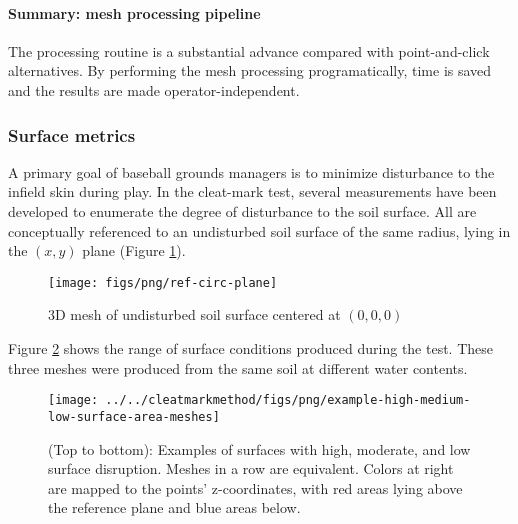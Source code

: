 \documentclass[
  letterpaper,
  openany]{book}
\begin{document}
\hypertarget{summary-mesh-processing-pipeline}{%
\paragraph{Summary: mesh processing pipeline}\label{summary-mesh-processing-pipeline}}

The processing routine is a substantial advance compared with point-and-click alternatives.
By performing the mesh processing programatically, time is saved and the results are made operator-independent.

\hypertarget{surface-metrics}{%
\subsubsection{Surface metrics}\label{surface-metrics}}

A primary goal of baseball grounds managers is to minimize disturbance to the infield skin during play.
In the cleat-mark test, several measurements have been developed to enumerate the degree of disturbance to the soil surface.
All are conceptually referenced to an undisturbed soil surface of the same radius, lying in the \((x, y)\) plane (Figure \ref{fig:ref-circ-plane-fig}).

\begin{figure}

{\centering \texttt{[image: figs/png/ref-circ-plane]} 

}

\caption[3D mesh of undisturbed soil surface]{3D mesh of undisturbed soil surface centered at $(0,0,0)$}\label{fig:ref-circ-plane-fig}
\end{figure}

Figure \ref{fig:example-meshes-panels} shows the range of surface conditions produced during the test.
These three meshes were produced from the same soil at different water contents.

\begin{figure}

{\centering \texttt{[image: ../../cleatmarkmethod/figs/png/example-high-medium-low-surface-area-meshes]} 

}

\caption[Example 3D meshes after testing.]{(Top to bottom): Examples of surfaces with high, moderate, and low surface disruption. Meshes in a row are equivalent. Colors at right are mapped to the points' z-coordinates, with red areas lying above the reference plane and blue areas below.}\label{fig:example-meshes-panels}
\end{figure}
\end{document}

